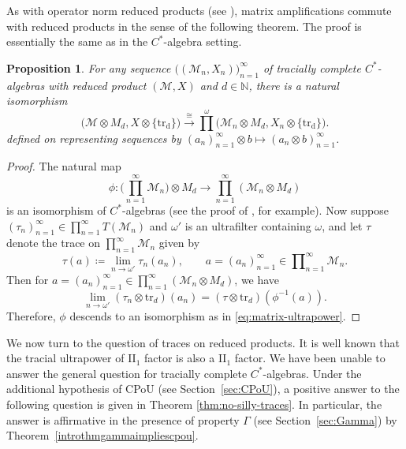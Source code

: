 \documentclass[a4paper,11pt]{amsart}
\newtheorem{proposition}[theorem]{Proposition}
\theoremstyle{definition}
\numberwithin{equation}{section}
\numberwithin{theorem}{section}
\newcommand{\M}{\mathcal{M}}
\begin{document}
As with operator norm reduced products (see \cite[Lemma~3.9.5]{Br08}), matrix amplifications commute with reduced products in the sense of the following theorem.  The proof is essentially the same as in the $C^*$-algebra setting.

\begin{proposition}\label{prop:matrix-ultrapower}
	For any sequence $\big((\M_n, X_n)\big)_{n=1}^\infty$ of tracially complete $C^*$-algebras with reduced product $(\M, X)$ and $d \in \mathbb N$, there is a natural isomorphism
	\begin{equation}\label{eq:matrix-ultrapower}
		\big(\M \otimes M_d, X \otimes \{\mathrm{tr_d}\}\big) \overset\cong\longrightarrow  \prod^\omega \big( \M_n \otimes M_d, X_n \otimes \{\mathrm{tr_d}\}\big).
	\end{equation}
	defined on representing sequences by $(a_n)_{n=1}^\infty \otimes b \mapsto (a_n \otimes b)_{n=1}^\infty$.
\end{proposition}

\begin{proof}
	The natural map 
	\begin{equation}
		\phi \colon \Big(\prod_{n=1}^\infty \M_n \Big)\otimes M_d \longrightarrow \prod_{n=1}^\infty (\M_n \otimes M_d)
	\end{equation}
	is an isomorphism of $C^*$-algebras (see the proof of \cite[Lemma~3.9.4]{Br08}, for example).
   Now suppose $(\tau_n)_{n=1}^\infty \in \prod_{n=1}^\infty T(\M_n)$ and $\omega'$ is an ultrafilter containing $\omega$, and let $\tau$ denote the trace on $\prod_{n=1}^\infty \M_n$ given by
	\begin{equation}
		\tau(a) \coloneqq \lim_{n \rightarrow \omega'} \tau_n(a_n), \qquad a =(a_n)_{n=1}^\infty \in \mathcal \prod_{n=1}^\infty \M_n.
	\end{equation}
	Then for $a =(a_n)_{n=1}^\infty \in \prod_{n=1}^\infty (\M_n \otimes M_d)$, we have
	\begin{equation}
		\lim_{n \rightarrow \omega'} (\tau_n \otimes \mathrm{tr}_d)(a_n) = (\tau \otimes \mathrm{tr}_d)(\phi^{-1}(a)).
	\end{equation}
	Therefore, $\phi$ descends to an isomorphism as in \eqref{eq:matrix-ultrapower}.
\end{proof}

We now turn to the question of traces on reduced products.  It is well known that the tracial ultrapower of II$_1$ factor is also a II$_1$ factor.  We have been unable to answer the general question for tracially complete $C^*$-algebras.  Under the additional hypothesis of CPoU (see Section~\ref{sec:CPoU}), a positive answer to the following question is given in Theorem \ref{thm:no-silly-traces}.  In particular, the answer is affirmative in the presence of property $\Gamma$ (see Section~\ref{sec:Gamma}) by Theorem~\ref{introthmgammaimpliescpou}.
\end{document}
